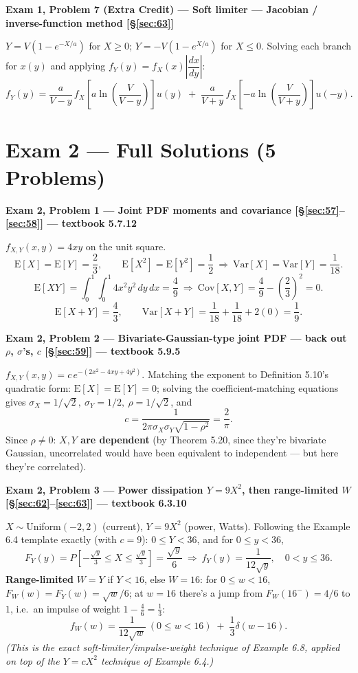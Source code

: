 \documentclass[11pt]{article}
\newcommand{\E}[1]{\mathrm{E}\left[#1\right]}
\newcommand{\Var}[1]{\mathrm{Var}\left[#1\right]}
\newcommand{\Cov}[1]{\mathrm{Cov}\left[#1\right]}
\renewcommand{\P}[1]{P\left[#1\right]}
\newcommand{\topline}[1]{\par\vspace{5pt}\noindent{\color{#1}\rule{\linewidth}{1.1pt}}\par\vspace{3pt}}
\newcommand{\botline}[1]{\par\vspace{2pt}\noindent{\color{#1}\rule{\linewidth}{1.1pt}}\par\vspace{8pt}}
\newenvironment{examprob}[2]{%
  \topline{examcol}\noindent\textbf{\color{examcol}#1 --- #2}\par\smallskip\noindent\ignorespaces
}{\botline{examcol}}
\begin{document}
\begin{examprob}{Exam 1, Problem 7 (Extra Credit)}{Soft limiter --- Jacobian / inverse-function method \hfill [\S\ref{sec:63}]}
$Y=V(1-e^{-X/a})$ for $X\ge0$; $Y=-V(1-e^{X/a})$ for $X\le0$. Solving each branch for $x(y)$
and applying $f_Y(y)=f_X(x)\left|\dfrac{dx}{dy}\right|$:
\[
f_Y(y) = \frac{a}{V-y}\,f_X\!\left[a\ln\!\left(\frac{V}{V-y}\right)\right]u(y) \;+\;
\frac{a}{V+y}\,f_X\!\left[-a\ln\!\left(\frac{V}{V+y}\right)\right]u(-y).
\]
\end{examprob}

\clearpage
\section{Exam 2 --- Full Solutions (5 Problems)}

\begin{examprob}{Exam 2, Problem 1}{Joint PDF moments and covariance \hfill [\S\ref{sec:57}--\ref{sec:58}] --- textbook 5.7.12}
$f_{X,Y}(x,y)=4xy$ on the unit square.
\[ \E{X}=\E{Y}=\frac23, \qquad \E{X^2}=\E{Y^2}=\frac12 \ \Rightarrow\ \Var{X}=\Var{Y}=\frac1{18}. \]
\[ \E{XY}=\int_0^1\!\int_0^1 4x^2y^2\,dy\,dx = \frac49 \ \Rightarrow\ \Cov{X,Y}=\frac49-\left(\frac23\right)^2=0. \]
\[ \E{X+Y}=\frac43, \qquad \Var{X+Y}=\frac1{18}+\frac1{18}+2(0)=\boxed{\frac19}. \]
\end{examprob}

\begin{examprob}{Exam 2, Problem 2}{Bivariate-Gaussian-type joint PDF --- back out $\rho$, $\sigma$'s, $c$ \hfill [\S\ref{sec:59}] --- textbook 5.9.5}
$f_{X,Y}(x,y)=c\,e^{-(2x^2-4xy+4y^2)}$. Matching the exponent to Definition 5.10's quadratic
form: $\E{X}=\E{Y}=0$; solving the coefficient-matching equations gives
$\sigma_X=1/\sqrt2,\ \sigma_Y=1/2,\ \boxed{\rho=1/\sqrt2}$, and
\[ c = \frac{1}{2\pi\sigma_X\sigma_Y\sqrt{1-\rho^2}} = \boxed{\frac2\pi}. \]
Since $\rho\ne0$: \textbf{$X,Y$ are dependent} (by Theorem 5.20, since they're bivariate
Gaussian, uncorrelated would have been equivalent to independent --- but here they're
correlated).
\end{examprob}

\begin{examprob}{Exam 2, Problem 3}{Power dissipation $Y=9X^2$, then range-limited $W$ \hfill [\S\ref{sec:62}--\ref{sec:63}] --- textbook 6.3.10}
$X\sim$Uniform$(-2,2)$ (current), $Y=9X^2$ (power, Watts). Following the Example 6.4 template
exactly (with $c=9$): $0\le Y<36$, and for $0\le y<36$,
\[ F_Y(y)=\P{-\tfrac{\sqrt y}{3}\le X\le\tfrac{\sqrt y}{3}} = \frac{\sqrt y}{6}
\ \Longrightarrow\ f_Y(y)=\frac{1}{12\sqrt y},\quad 0<y\le36. \]
\textbf{Range-limited} $W=Y$ if $Y<16$, else $W=16$: for $0\le w<16$, $F_W(w)=F_Y(w)=\sqrt
w/6$; at $w=16$ there's a jump from $F_W(16^-)=4/6$ to $1$, i.e.\ an impulse of weight
$1-\frac46=\frac13$:
\[ f_W(w) = \frac{1}{12\sqrt w}\ (0\le w<16) \;+\; \frac13\delta(w-16). \]
\emph{(This is the exact soft-limiter/impulse-weight technique of Example 6.8, applied on top
of the $Y{=}cX^2$ technique of Example 6.4.)}
\end{examprob}
\end{document}
